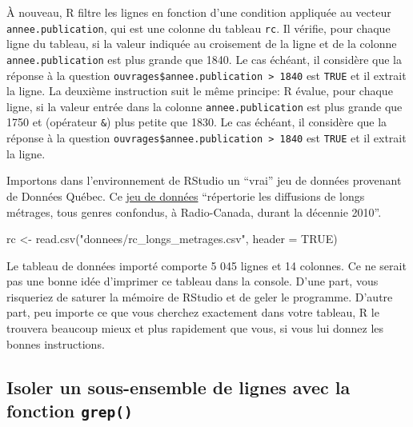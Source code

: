 \documentclass[
  letterpaper,
  DIV=11,
  numbers=noendperiod]{scrartcl}
\newenvironment{Shaded}{\begin{snugshade}}{\end{snugshade}}
\newcommand{\AttributeTok}[1]{\textcolor[rgb]{0.40,0.45,0.13}{#1}}
\newcommand{\ConstantTok}[1]{\textcolor[rgb]{0.56,0.35,0.01}{#1}}
\newcommand{\FunctionTok}[1]{\textcolor[rgb]{0.28,0.35,0.67}{#1}}
\newcommand{\NormalTok}[1]{\textcolor[rgb]{0.00,0.23,0.31}{#1}}
\newcommand{\OtherTok}[1]{\textcolor[rgb]{0.00,0.23,0.31}{#1}}
\newcommand{\StringTok}[1]{\textcolor[rgb]{0.13,0.47,0.30}{#1}}
\begin{document}
À nouveau, R filtre les lignes en fonction d'une condition appliquée au
vecteur \texttt{annee.publication}, qui est une colonne du tableau
\texttt{rc}. Il vérifie, pour chaque ligne du tableau, si la valeur
indiquée au croisement de la ligne et de la colonne
\texttt{annee.publication} est plus grande que 1840. Le cas échéant, il
considère que la réponse à la question
\texttt{ouvrages\$annee.publication\ \textgreater{}\ 1840} est
\texttt{TRUE} et il extrait la ligne. La deuxième instruction suit le
même principe: R évalue, pour chaque ligne, si la valeur entrée dans la
colonne \texttt{annee.publication} est plus grande que 1750 et
(opérateur \texttt{\&}) plus petite que 1830. Le cas échéant, il
considère que la réponse à la question
\texttt{ouvrages\$annee.publication\ \textgreater{}\ 1840} est
\texttt{TRUE} et il extrait la ligne.

Importons dans l'environnement de RStudio un ``vrai'' jeu de données
provenant de Données Québec. Ce
\href{https://www.donneesquebec.ca/recherche/dataset/longs-metrages-diffuses-a-radio-canada}{jeu
de données} ``répertorie les diffusions de longs métrages, tous genres
confondus, à Radio-Canada, durant la décennie 2010''.

\begin{Shaded}
\begin{Highlighting}[]
\NormalTok{rc }\OtherTok{\textless{}{-}} \FunctionTok{read.csv}\NormalTok{(}\StringTok{"donnees/rc\_longs\_metrages.csv"}\NormalTok{, }\AttributeTok{header =} \ConstantTok{TRUE}\NormalTok{)}
\end{Highlighting}
\end{Shaded}

Le tableau de données importé comporte 5 045 lignes et 14 colonnes. Ce
ne serait pas une bonne idée d'imprimer ce tableau dans la console.
D'une part, vous risqueriez de saturer la mémoire de RStudio et de geler
le programme. D'autre part, peu importe ce que vous cherchez exactement
dans votre tableau, R le trouvera beaucoup mieux et plus rapidement que
vous, si vous lui donnez les bonnes instructions.

\hypertarget{isoler-un-sous-ensemble-de-lignes-avec-la-fonction-grep}{%
\subsection{\texorpdfstring{Isoler un sous-ensemble de lignes avec la
fonction
\texttt{grep()}}{Isoler un sous-ensemble de lignes avec la fonction grep()}}\label{isoler-un-sous-ensemble-de-lignes-avec-la-fonction-grep}}
\end{document}
